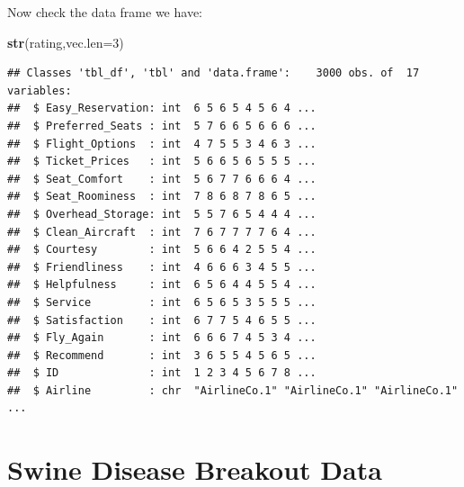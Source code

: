 \documentclass[]{book}
\newenvironment{Shaded}{\begin{snugshade}}{\end{snugshade}}
\newcommand{\KeywordTok}[1]{\textcolor[rgb]{0.13,0.29,0.53}{\textbf{{#1}}}}
\newcommand{\DataTypeTok}[1]{\textcolor[rgb]{0.13,0.29,0.53}{{#1}}}
\newcommand{\DecValTok}[1]{\textcolor[rgb]{0.00,0.00,0.81}{{#1}}}
\newcommand{\StringTok}[1]{\textcolor[rgb]{0.31,0.60,0.02}{{#1}}}
\newcommand{\CommentTok}[1]{\textcolor[rgb]{0.56,0.35,0.01}{\textit{{#1}}}}
\newcommand{\NormalTok}[1]{{#1}}
\theoremstyle{definition}
\theoremstyle{definition}
\theoremstyle{remark}
\begin{document}
\begin{Shaded}
\begin{Highlighting}[]
{\CommentTok{# assign names to the variables in the data frame}
\KeywordTok{names}\NormalTok{(rating)<-}\KeywordTok{c}\NormalTok{(}
  \StringTok{"Easy_Reservation"}\NormalTok{,}
  \StringTok{"Preferred_Seats"}\NormalTok{,}
  \StringTok{"Flight_Options"}\NormalTok{,}
  \StringTok{"Ticket_Prices"}\NormalTok{,}
  \StringTok{"Seat_Comfort"}\NormalTok{,}
  \StringTok{"Seat_Roominess"}\NormalTok{,}
  \StringTok{"Overhead_Storage"}\NormalTok{,}
  \StringTok{"Clean_Aircraft"}\NormalTok{,}
  \StringTok{"Courtesy"}\NormalTok{,}
  \StringTok{"Friendliness"}\NormalTok{,}
  \StringTok{"Helpfulness"}\NormalTok{,}
  \StringTok{"Service"}\NormalTok{,}
  \StringTok{"Satisfaction"}\NormalTok{,}
  \StringTok{"Fly_Again"}\NormalTok{,}
  \StringTok{"Recommend"}\NormalTok{,}
  \StringTok{"ID"}\NormalTok{,}
  \StringTok{"Airline"}\NormalTok{)}
\end{Highlighting}
\end{Shaded}

Now check the data frame we have:

\begin{Shaded}
\begin{Highlighting}[]
\KeywordTok{str}\NormalTok{(rating,}\DataTypeTok{vec.len=}\DecValTok{3}\NormalTok{)}
\end{Highlighting}
\end{Shaded}

\begin{verbatim}
## Classes 'tbl_df', 'tbl' and 'data.frame':    3000 obs. of  17 variables:
##  $ Easy_Reservation: int  6 5 6 5 4 5 6 4 ...
##  $ Preferred_Seats : int  5 7 6 6 5 6 6 6 ...
##  $ Flight_Options  : int  4 7 5 5 3 4 6 3 ...
##  $ Ticket_Prices   : int  5 6 6 5 6 5 5 5 ...
##  $ Seat_Comfort    : int  5 6 7 7 6 6 6 4 ...
##  $ Seat_Roominess  : int  7 8 6 8 7 8 6 5 ...
##  $ Overhead_Storage: int  5 5 7 6 5 4 4 4 ...
##  $ Clean_Aircraft  : int  7 6 7 7 7 7 6 4 ...
##  $ Courtesy        : int  5 6 6 4 2 5 5 4 ...
##  $ Friendliness    : int  4 6 6 6 3 4 5 5 ...
##  $ Helpfulness     : int  6 5 6 4 4 5 5 4 ...
##  $ Service         : int  6 5 6 5 3 5 5 5 ...
##  $ Satisfaction    : int  6 7 7 5 4 6 5 5 ...
##  $ Fly_Again       : int  6 6 6 7 4 5 3 4 ...
##  $ Recommend       : int  3 6 5 5 4 5 6 5 ...
##  $ ID              : int  1 2 3 4 5 6 7 8 ...
##  $ Airline         : chr  "AirlineCo.1" "AirlineCo.1" "AirlineCo.1" ...
\end{verbatim}

\section{Swine Disease Breakout Data}\label{swine-disease-breakout-data}
\end{document}
